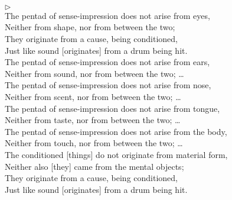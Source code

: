 \\[1.5mm]
\\[1.5mm]
\\

\addtocounter{sennum}{-1}
$\triangleright$  \\
The pentad of sense-impression does not arise from eyes,\\
Neither from shape, nor from between the two;\\
They originate from a cause, being conditioned,\\
Just like sound [originates] from a drum being hit.\\[1.5mm]
The pentad of sense-impression does not arise from ears,\\
Neither from sound, nor from between the two; \ldots\\
The pentad of sense-impression does not arise from nose,\\
Neither from scent, nor from between the two; \ldots\\
The pentad of sense-impression does not arise from tongue,\\
Neither from taste, nor from between the two; \ldots\\
The pentad of sense-impression does not arise from the body,\\
Neither from touch, nor from between the two; \ldots\\[1.5mm]
The conditioned [things] do not originate from material form,\\
Neither also [they] came from the mental objects;\\
They originate from a cause, being conditioned,\\
Just like sound [originates] from a drum being hit.\\[1.5mm]

